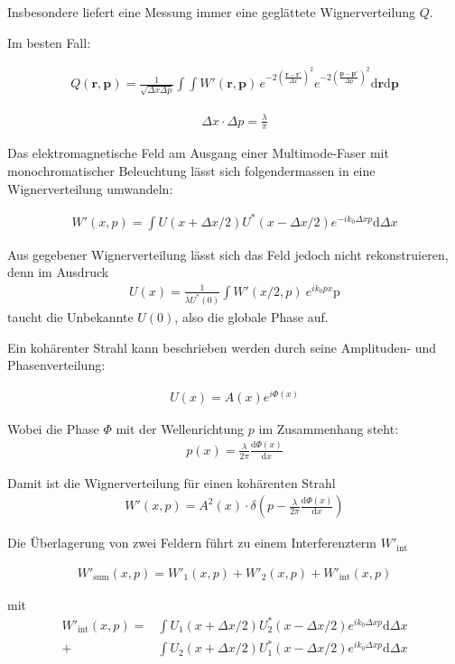 \documentclass{article}
\newcommand{\vect}[1]{\mathbf{#1}}
\renewcommand{\r}{\vect r}
\newcommand{\p}{\vect p}
\begin{document}
Insbesondere liefert eine Messung immer eine gegl\"attete
Wignerverteilung $Q$.


Im besten Fall: 

\begin{align}
  Q(\r,\p) = \frac{1}{\sqrt{\Delta x \Delta p }}\int\int W'(\r,\p)\, e^{-2 \left(\frac{\r-\r'}{\Delta x}\right)^2} e^{- 2 \left(\frac{\p-\p'}{\Delta p}\right)^2}\textrm{d}\r\textrm{d}\p
\end{align}

\begin{align}
  \Delta x \cdot \Delta p = \frac{\lambda}{\pi}
\end{align}

Das elektromagnetische Feld am Ausgang einer Multimode-Faser mit
monochromatischer Beleuchtung l\"asst sich folgendermassen in eine
Wignerverteilung umwandeln:

\begin{align}
  W'(x,p) = \int U(x+\Delta x/2) U^*(x-\Delta x/2) e^{-i k_0 \Delta x p}\textrm{d}\Delta x
\end{align}

Aus gegebener Wignerverteilung l\"asst sich das Feld jedoch nicht
rekonstruieren, denn im Ausdruck
\begin{align}
  U(x) = \frac{1}{\lambda U^*(0)} \int W'(x/2,p)\ e^{ik_0 px} \textrm{p}
\end{align}
taucht die Unbekannte $U(0)$, also die globale Phase auf.

Ein koh\"arenter Strahl kann beschrieben werden durch seine
Amplituden- und Phasenverteilung:

\begin{align}
  U(x) = A(x) e^{i\Phi(x)}
\end{align}

Wobei die Phase $\Phi$ mit der Wellenrichtung $p$ im Zusammenhang steht:
\begin{align}
  p(x) = \frac{\lambda}{2\pi} \frac{\textrm{d} \Phi(x)}{\textrm{d} x}
\end{align}

Damit ist die Wignerverteilung f\"ur einen koh\"arenten Strahl
\begin{align}
  W'(x,p)= A^2(x) \cdot \delta\left(p-\frac{\lambda}{2\pi}
    \frac{\textrm{d} \Phi(x)}{\textrm{d} x}\right)
\end{align}

Die \"Uberlagerung von zwei Feldern f\"uhrt zu einem Interferenzterm
$W'_\textrm{int}$

\begin{align}
  W'_\textrm{sum}(x,p) = W'_1(x,p) + W'_2(x,p) + W'_\textrm{int} (x,p)
\end{align}

mit 
\begin{align}
  W'_\textrm{int} (x,p) = 
  &\int U_1(x+\Delta x/2)  U^*_2(x-\Delta x/2) e^{i k_0 \Delta x p} \textrm{d} \Delta x \\
  + &\int U_2(x+\Delta x/2)  U^*_1(x-\Delta x/2) e^{i k_0 \Delta x p} \textrm{d} \Delta x
\end{align}
\end{document}
